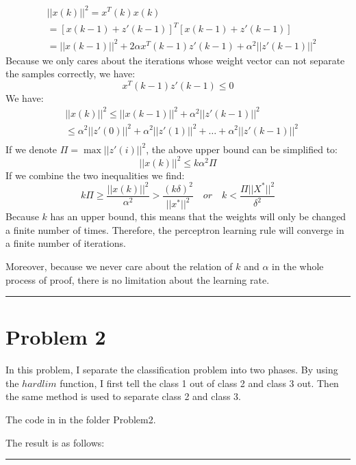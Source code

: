 \documentclass[twoside]{article}
\newenvironment{solution}{{\bf Solution:}}{\hfill\rule{2mm}{2mm}}
\begin{document}
\begin{solution}
\begin{align*}
& {||x(k)||}^2=x^T(k)x(k) \\
& =[x(k-1)+z'(k-1)]^T[x(k-1)+z'(k-1)] \\
& =||x(k-1)||^2+2\alpha x^T(k-1)z'(k-1)+\alpha^2||z'(k-1)||^2
\end{align*}
Because we only cares about the iterations whose weight vector can not separate the samples correctly, we have:
$$
x^T(k-1)z'(k-1)\leq 0
$$
We have:
\begin{align*}
& {||x(k)||}^2 \leq {||x(k-1)||}^2+\alpha^2||z'(k-1)||^2\\
& \leq \alpha^2||z'(0)||^2+\alpha^2||z'(1)||^2 +\dots+\alpha^2||z'(k-1)||^2\\
\end{align*}
If we denote $\Pi = \max{||z'(i)||^2}$, the above upper bound can be simplified to:
$$
 {||x(k)||}^2 \leq k\alpha^2 \Pi
$$
If we combine the two inequalities we find:
$$
k\Pi\geq\frac{||x(k)||^2}{\alpha^2}>\frac{(k\delta)^2}{||x^*||^2} \quad or \quad k<\frac{\Pi ||X^*||^2}{\delta^2}
$$
Because $k$ has an upper bound, this means that the weights will only be changed a finite number of times. Therefore, the perceptron learning rule will converge in a finite number of iterations.

Moreover, because we never care about the relation of $k$ and $\alpha$ in the whole process of proof, there is no limitation about the learning rate.
\end{solution}


\section*{Problem 2}
\begin{solution}
In this problem, I separate the classification problem into two phases. By using the $hardlim$ function, I first tell the class 1 out of class 2 and class 3 out. Then the same method is used to separate class 2 and class 3.

The code in in the folder Problem2.

The result is as follows:


\end{solution}
\end{document}
